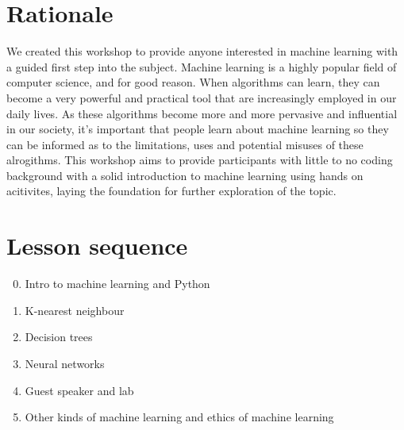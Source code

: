 \documentclass[11pt]{article}
\begin{document}
\section*{Rationale}

We created this workshop to provide anyone interested in machine learning with a
guided first step into the subject. Machine learning is a highly popular field
of computer science, and for good reason. When algorithms can learn, they can become a very powerful and practical tool that
are increasingly employed in our daily lives. As these algorithms
become more and more pervasive and influential in our society, it's important that people learn about machine learning
so they can be informed as to the limitations, uses and potential misuses of these alrogithms.
This workshop aims to provide participants with little to no coding
background with a solid introduction to machine learning using hands on
acitivites, laying the foundation for further exploration of the topic.

\section*{Lesson sequence}

\begin{enumerate}
    \setcounter{enumi}{-1}
  \item Intro to machine learning and Python
  \item K-nearest neighbour
  \item Decision trees
  \item Neural networks
  \item Guest speaker and lab
  \item Other kinds of machine learning and ethics of machine learning
\end{enumerate}
\end{document}
